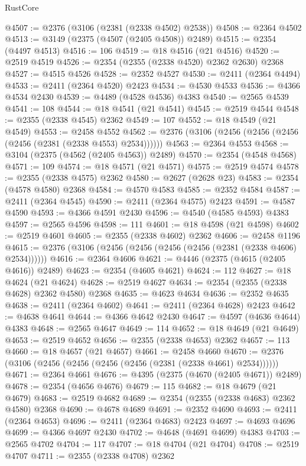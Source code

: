 \begin{lexlean}{RustCore}
\begin{coremodule}
@4507 := @2376 (@3106 (@2381 (@2338 @4502) @2538))
@4508 := @2364 @4502
@4513 := @3149 (@2375 (@4507 (@2405 @4508)) @2489)
@4515 := @2354 (@4497 @4513)
@4516 := 106
@4519 := @18 @4516 (@21 @4516)
@4520 := @2519 @4519
@4526 := @2354 (@2355 (@2338 @4520) @2362 @2630) @2368
@4527 := @4515 @4526
@4528 := @2352 @4527
@4530 := @2411 (@2364 @4494)
@4533 := @2411 (@2364 @4520) @2423
@4534 := @4530 @4533
@4536 := @4366 @4534 @2430
@4539 := @4489 (@4528 @4536) @4383
@4540 := @2565 @4539
@4541 := 108
@4544 := @18 @4541 (@21 @4541)
@4545 := @2519 @4544
@4548 := @2355 (@2338 @4545) @2362
@4549 := 107
@4552 := @18 @4549 (@21 @4549)
@4553 := @2458 @4552
@4562 := @2376 (@3106 (@2456 (@2456 (@2456 (@2456 (@2381 (@2338 @4553) @2534))))))
@4563 := @2364 @4553
@4568 := @3104 (@2375 (@4562 (@2405 @4563)) @2489)
@4570 := @2354 (@4548 @4568)
@4571 := 109
@4574 := @18 @4571 (@21 @4571)
@4575 := @2519 @4574
@4578 := @2355 (@2338 @4575) @2362
@4580 := @2627 (@2628 @23)
@4583 := @2354 (@4578 @4580) @2368
@4584 := @4570 @4583
@4585 := @2352 @4584
@4587 := @2411 (@2364 @4545)
@4590 := @2411 (@2364 @4575) @2423
@4591 := @4587 @4590
@4593 := @4366 @4591 @2430
@4596 := @4540 (@4585 @4593) @4383
@4597 := @2565 @4596
@4598 := 111
@4601 := @18 @4598 (@21 @4598)
@4602 := @2519 @4601
@4605 := @2355 (@2338 @4602) @2362
@4606 := @2458 @1196
@4615 := @2376 (@3106 (@2456 (@2456 (@2456 (@2456 (@2381 (@2338 @4606) @2534))))))
@4616 := @2364 @4606
@4621 := @4446 (@2375 (@4615 (@2405 @4616)) @2489)
@4623 := @2354 (@4605 @4621)
@4624 := 112
@4627 := @18 @4624 (@21 @4624)
@4628 := @2519 @4627
@4634 := @2354 (@2355 (@2338 @4628) @2362 @4580) @2368
@4635 := @4623 @4634
@4636 := @2352 @4635
@4638 := @2411 (@2364 @4602)
@4641 := @2411 (@2364 @4628) @2423
@4642 := @4638 @4641
@4644 := @4366 @4642 @2430
@4647 := @4597 (@4636 @4644) @4383
@4648 := @2565 @4647
@4649 := 114
@4652 := @18 @4649 (@21 @4649)
@4653 := @2519 @4652
@4656 := @2355 (@2338 @4653) @2362
@4657 := 113
@4660 := @18 @4657 (@21 @4657)
@4661 := @2458 @4660
@4670 := @2376 (@3106 (@2456 (@2456 (@2456 (@2456 (@2381 (@2338 @4661) @2534))))))
@4671 := @2364 @4661
@4676 := @4395 (@2375 (@4670 (@2405 @4671)) @2489)
@4678 := @2354 (@4656 @4676)
@4679 := 115
@4682 := @18 @4679 (@21 @4679)
@4683 := @2519 @4682
@4689 := @2354 (@2355 (@2338 @4683) @2362 @4580) @2368
@4690 := @4678 @4689
@4691 := @2352 @4690
@4693 := @2411 (@2364 @4653)
@4696 := @2411 (@2364 @4683) @2423
@4697 := @4693 @4696
@4699 := @4366 @4697 @2430
@4702 := @4648 (@4691 @4699) @4383
@4703 := @2565 @4702
@4704 := 117
@4707 := @18 @4704 (@21 @4704)
@4708 := @2519 @4707
@4711 := @2355 (@2338 @4708) @2362

\end{coremodule}
\end{lexlean}
